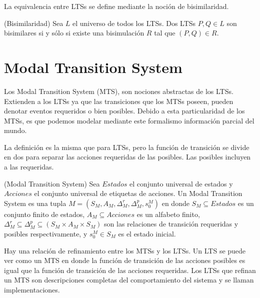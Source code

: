 La equivalencia entre LTSs se define mediante la noción de bisimilaridad.

\begin{definition}{(Bisimilaridad)}
Sea $L$ el universo de todos los LTSs. Dos LTSs $P, Q \in L$ son bisimilares si 
y sólo si existe una bisimulación $R$ tal que $(P, Q) \in R$.

\end{definition}


\section{Modal Transition System}
Los Modal Transition System \cite{MTS} (MTS), son nociones abstractas de los LTSs. Extienden a los LTSs ya que las transiciones 
que los MTSs poseen, pueden denotar eventos requeridos o bien posibles. Debido a esta particularidad de los MTSs, es 
que podemos modelar mediante este formalismo información parcial del mundo.

\vspace{\baselineskip}
La definición es la misma que para LTSs, pero la función de transición se divide en dos para separar las acciones 
requeridas de las posibles. Las posibles incluyen a las requeridas.

\begin{definition}{(Modal Transition System)}
Sea $Estados$ el conjunto universal de estados y $Acciones$ el conjunto universal de etiquetas de acciones. Un Modal 
Transition System es una tupla $M = (S_{M}, A_{M}, \Delta_{M}^{r}, \Delta_{M}^{p}, s_{0}^{M})$ en donde $S_{M} \subseteq Estados$ 
es un conjunto finito de estados, $A_{M} \subseteq Acciones$ es un alfabeto finito, 
$\Delta_{M}^{r} \subseteq \Delta_{M}^{p} \subseteq (S_{M} \times A_{M} \times S_{M})$ son las relaciones de transición requeridas 
y posibles respectivamente, y $s_{0}^{M} \in S_{M}$ es el estado inicial.
\end{definition}

Hay una relación de refinamiento entre los MTSs y los LTSs. Un LTS se puede ver 
como un MTS en donde la función de 
transición de las acciones posibles es igual que la función de transición de las acciones requeridas. Los LTSs que 
refinan un MTS son descripciones completas del comportamiento del sistema y se llaman implementaciones.

